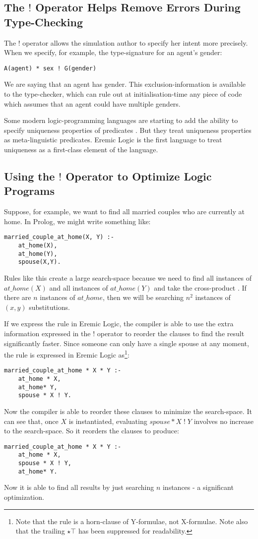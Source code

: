 \subsection{The $!$ Operator Helps Remove Errors During Type-Checking}
The $!$ operator allows the simulation author to specify her intent more precisely.
When we specify, for example, the type-signature for an agent's gender:
\begin{verbatim}
A(agent) * sex ! G(gender)
\end{verbatim}
We are saying that an agent has  gender.
This exclusion-information is available to the type-checker, which can rule out at initialisation-time any piece of code which assumes that an agent could have multiple genders. 

Some modern logic-programming languages are starting to add the ability to specify uniqueness properties of predicates \cite{mercury}. 
But they treat uniqueness properties as meta-linguistic predicates. 
Eremic Logic is the first language to treat uniqueness as a first-class element of the language.

\subsection{Using the $!$ Operator to Optimize Logic Programs}
Suppose, for example, we want to find all married couples who are currently at home.
In Prolog, we might write something like:
\begin{verbatim}
married_couple_at_home(X, Y) :-
    at_home(X),
    at_home(Y),
    spouse(X,Y).
\end{verbatim}	
Rules like this create a large search-space because we need to find all instances of $at\_home(X)$ and all instances of  $at\_home(Y)$ and take the cross-product \cite{smith-and-genesereth}. If there are $n$ instances of $at\_home$, then we will be searching $n^2$ instances of $(x,y)$ substitutions.

If we express the rule in Eremic Logic, the compiler is able to use the extra information expressed in the $!$ operator to reorder the clauses to find the result significantly faster.
Since someone can only have a single spouse at any moment, the rule is expressed in Eremic Logic as\footnote{Note that the rule is a horn-clause of Y-formulae, not X-formulae. Note also that the trailing $\star \top$ has been suppressed for readability.}:
\begin{verbatim}
married_couple_at_home * X * Y :-
    at_home * X,
    at_home* Y,
    spouse * X ! Y.
\end{verbatim}	
Now the compiler is able to reorder these clauses to minimize the search-space. 
It can see that, once $X$ is instantiated, evaluating $spouse * X \; ! \; Y$ involves no increase to the search-space.
So it reorders the clauses to produce:
\begin{verbatim}
married_couple_at_home * X * Y :-
    at_home * X,
    spouse * X ! Y,
    at_home* Y.
\end{verbatim}	
Now it is able to find all results by just searching $n$ instances - a significant optimization.

